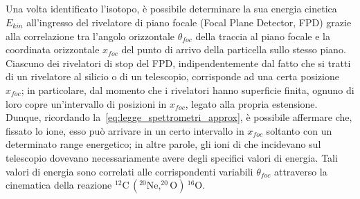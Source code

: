 \subsection{}

Una volta identificato l'isotopo, è possibile determinare la sua energia cinetica $E_{kin}$ all'ingresso del rivelatore di piano focale (Focal Plane Detector, FPD) grazie alla correlazione tra l'angolo orizzontale $\theta_{foc}$ della traccia al piano focale e la coordinata orizzontale $x_{foc}$ del punto di arrivo della particella sullo stesso piano.
Ciascuno dei rivelatori di stop del FPD, indipendentemente dal fatto che si tratti di un rivelatore al silicio o di un telescopio, corrisponde ad una certa posizione $x_{foc}$; in particolare, dal momento che i rivelatori hanno superficie finita, ognuno di loro copre un'intervallo di posizioni in $x_{foc}$, legato alla propria estensione.
Dunque, ricordando la~\ref{eq:legge_spettrometri_approx}, è possibile affermare che, fissato lo ione, esso può arrivare in un certo intervallo in $x_{foc}$ soltanto con un determinato range energetico; in altre parole, gli ioni di  che incidevano sul telescopio dovevano necessariamente avere degli specifici valori di energia.
Tali valori di energia sono correlati alle corrispondenti variabili $\theta_{foc}$ attraverso la cinematica della reazione $^{12}\mbox{C}\,  ( ^{20}\mbox{Ne}, ^{20}\mbox{O} ) \, ^{16}\mbox{O} $.

